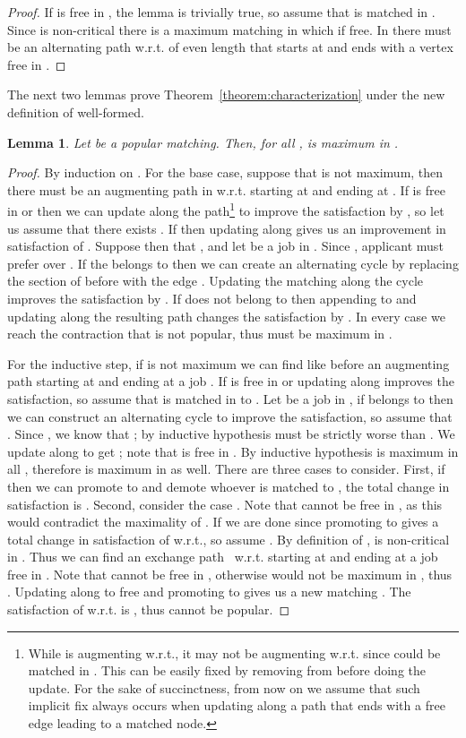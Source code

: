 \documentclass[11pt]{article}
\newcommand{\wrt}{{w.r.t.}\xspace}
\newtheorem{lemma}{Lemma}
\begin{document}
{\begin{proof}
If  is free in , the lemma is trivially true, so assume that  is matched in .
Since  is non-critical there is a maximum matching  in which  if free. In  there must be an alternating path \wrt  of even length that starts at  and ends with a vertex free in .
\end{proof}

The next two lemmas prove Theorem~\ref{theorem:characterization} under the new definition of well-formed.

\begin{lemma} \label{lemma:first-ties} Let  be a popular matching. Then, for all ,  is maximum in .
\end{lemma}

\begin{proof} 
By induction on . For the base case, suppose that  is not maximum, then there must be an augmenting path in  \wrt  starting at  and ending at . If  is free in  or  then we can update  along the path\footnote{While  is augmenting \wrt , it may not be augmenting \wrt  since  could be matched in . This can be easily fixed by removing  from  before doing the update. For the sake of succinctness, from now on we assume that such implicit fix always occurs when updating along a path that ends with a free edge leading to a matched node.} to improve the satisfaction by , so let us assume that there exists . If  then updating  along  gives us an improvement in satisfaction of . Suppose then that , and let  be a job in . Since , applicant  must prefer  over . If the  belongs to  then we can create an alternating cycle by replacing the section of  before  with the edge . Updating the matching along the cycle improves the satisfaction by . If  does not belong to  then appending  to  and updating along the resulting path changes the satisfaction by . In every case we reach the contraction that  is not popular, thus  must be maximum in .

For the inductive step, if  is not maximum we can find like before an augmenting path  starting at  and ending at a job . If  is free in  or  updating along  improves the satisfaction, so assume that  is matched in  to . Let  be a job in , if  belongs to  then we can construct an alternating cycle to improve the satisfaction, so assume that . Since , we know that ; by inductive hypothesis  must be strictly worse than . We update  along  to get ; note that  is free in . By inductive hypothesis  is maximum in all , therefore  is maximum in  as well. There are three cases to consider. First, if  then we can promote  to  and demote whoever is matched to , the total change in satisfaction is . Second, consider the case . Note that  cannot be free in , as this would contradict the maximality of . If  we are done since promoting  to  gives a total change in satisfaction of   \wrt , so assume . By definition of ,  is non-critical in . Thus we can find an exchange path~ \wrt  starting at  and ending at a job  free in . Note that  cannot be free in , otherwise  would not be maximum in , thus . Updating  along  to free  and promoting  to  gives us a new matching . The satisfaction of  \wrt  is , thus  cannot be popular.


\end{proof}}
\end{document}
